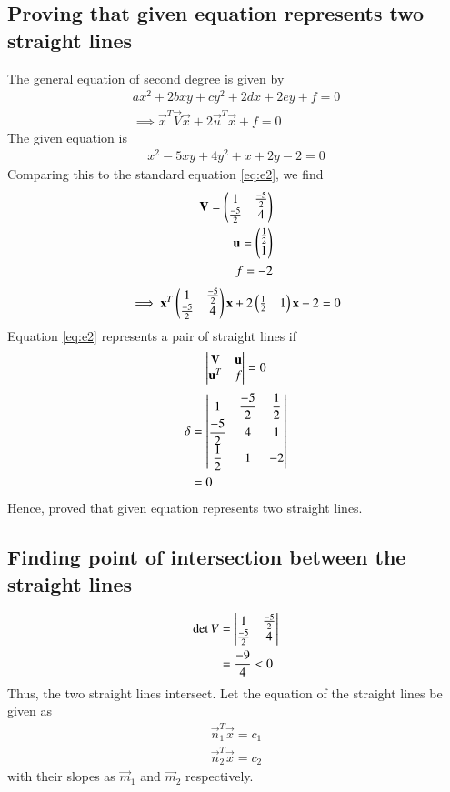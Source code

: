 \documentclass[journal,12pt,twocolumn]{IEEEtran}
\begin{document}
\subsection{Proving that given equation represents two straight lines}
The general equation of second degree is given by
\begin{align}
    \label{eq:e1}ax^2+2bxy+cy^2+2dx+2ey+f=0\\
    \label{eq:e2}\implies \vec{x}^T\vec{V}\vec{x}+2\vec{u}^T\vec{x}+f=0
\end{align}
The given equation is
\begin{align}
    x^2-5xy+4y^2+x+2y-2=0
\end{align}
Comparing this to the standard equation \eqref{eq:e2}, we find
\begin{align}
    \mathbf{V} = \begin{pmatrix}1 & \frac{-5}{2} \\ \frac{-5}{2} & 4\end{pmatrix}\\ \mathbf{u} = \begin{pmatrix}\frac{1}{2} \\ 1\end{pmatrix}\\
    f = -2
\end{align}
\begin{align}\label{eq:e3}
    \implies\mathbf{x}^T\begin{pmatrix}1 & \frac{-5}{2} \\ \frac{-5}{2} & 4\end{pmatrix}\mathbf{x} + 2\begin{pmatrix}\frac{1}{2} & 1\end{pmatrix}\mathbf{x} -2 = 0
\end{align}
Equation \eqref{eq:e2} represents a pair of straight lines if
\begin{align}
    \label{eq:det}\begin{vmatrix}\mathbf{V} & \mathbf{u}\\ \mathbf{u}^T & f\end{vmatrix}=0
\end{align}
\begin{align}
    \delta & = \begin{vmatrix}1 & \dfrac{-5}{2} & \dfrac{1}{2} \\ \dfrac{-5}{2} & 4 & 1 \\ \dfrac{1}{2} & 1 & -2\end{vmatrix} \\ & = 0
\end{align}
Hence, proved that given equation represents two straight lines.
\subsection{Finding point of intersection between the straight lines}
\begin{align}
    \det V & = \begin{vmatrix}1 & \frac{-5}{2}\nonumber\\ \frac{-5}{2} & 4\end{vmatrix}\\ & = \frac{-9}{4} < 0
\end{align}
Thus, the two straight lines intersect. Let the equation of the straight lines be given as
\begin{align}
    \label{eq:line1}\vec{n}_1^T\vec{x}=c_1 \\
    \label{eq:line2}\vec{n}_2^T\vec{x}=c_2
\end{align}
with their slopes as $\vec{m}_1$ and $\vec{m}_2$ respectively.
\end{document}
